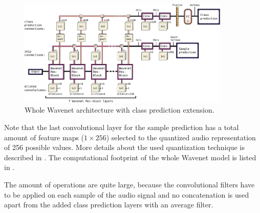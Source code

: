\begin{figure}[!ht]
  \centering
    \includegraphics[width=0.9\textwidth]{./4_nn/figs/nn_arch_wavenet_all.pdf}
  \caption{Whole Wavenet architecture with class prediction extension.}
  \label{fig:nn_arch_wavenet_all}
\end{figure}
\FloatBarrier
\noindent
Note that the last convolutional layer for the sample prediction has a total amount of feature maps ($1 \times 256$) selected to the quantized audio representation of 256 possible values.
More details about the used quantization technique is described in \cite{Oord2016}.
The computational footprint of the whole Wavenet model is listed in .

The amount of operations are quite large, because the convolutional filters have to be applied on each sample of the audio signal and no concatenation is used apart from the added class prediction layers with an average filter.